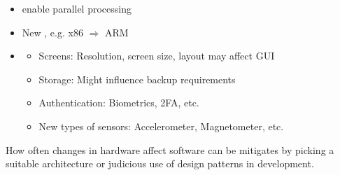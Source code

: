 \documentclass[
    ../../Software_Engineering_Summary.tex,
]
{subfiles}
\begin{document}
\begin{defbox}
	\begin{itemize}
    \item {} enable parallel processing
    \item New , e.g. x86 $\Rightarrow$ ARM
    \item {}
    \begin{itemize}
        \item Screens: Resolution, screen size, layout may affect GUI
        \item Storage: Might influence backup requirements
        \item Authentication: Biometrics, 2FA, etc.
        \item New types of sensors: Accelerometer, Magnetometer, etc.
    \end{itemize}
\end{itemize}

How often changes in hardware affect software can be mitigates by picking a suitable architecture or judicious use of design patterns in development.
\end{defbox}
\end{document}
